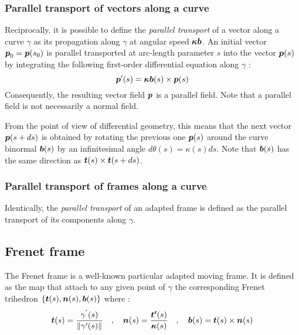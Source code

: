 \subsubsection{Parallel transport of vectors along a curve}
Reciprocally, it is possible to define the \emph{parallel transport} of a vector along a curve $\gamma$ as its propagation along $\gamma$ at angular speed $\boldsymbol{\kappa b}$. An initial vector $\boldsymbol{p}_0 = \boldsymbol{p}(s_0)$ is parallel transported at arc-length parameter $s$ into the vector $\boldsymbol{p}(s)$ by integrating the following first-order differential equation along $\gamma$ :
\begin{equation}
	\boldsymbol{p}'(s) = \boldsymbol{\kappa b}(s) \times  \boldsymbol{p}(s)
\end{equation}
Consequently, the resulting vector field $\boldsymbol{p}$ is a parallel field. Note that a parallel field is not necessarily a normal field. 

From the point of view of differential geometry, this means that the next vector $\boldsymbol{p}(s+ds)$ is obtained by rotating the previous one $\boldsymbol{p}(s)$ around the curve binormal $\boldsymbol{b}(s)$ by an infinitesimal angle $d\theta(s) = \kappa(s) ds$. Note that $\boldsymbol{b}(s)$ has the same direction as $\boldsymbol{t}(s) \times \boldsymbol{t}(s+ds)$.

\subsubsection{Parallel transport of frames along a curve}
Identically, the \emph{parallel transport} of an adapted frame is defined as the parallel transport of its components along $\gamma$.

%

\subsection{Frenet frame}

The Frenet frame is a well-known particular adapted moving frame. It is defined as the map that attach to any given point of $\gamma$ the corresponding Frenet trihedron $\{\boldsymbol{t}(s),\boldsymbol{n}(s),\boldsymbol{b}(s)\}$ where :
\begin{gather}
\boldsymbol{t}(s) = \frac{\gamma^{'}(s)}{\|\gamma'(s)\|}
\quad,\quad
\boldsymbol{n}(s) = \frac{\boldsymbol{t'}(s)}{\boldsymbol{\kappa}(s)}
\quad,\quad
\boldsymbol{b}(s)= \boldsymbol{t}(s)\times\boldsymbol{n}(s)
\end{gather}

